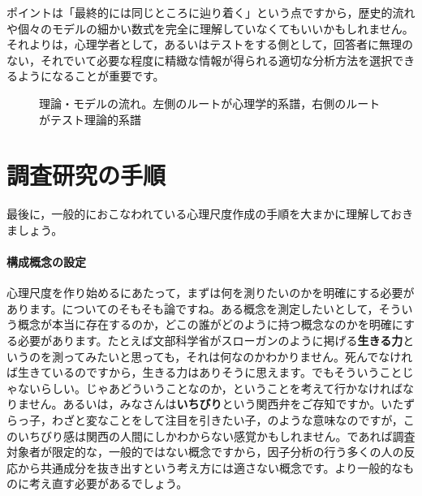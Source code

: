 \documentclass{ltjsbook}
\begin{document}
ポイントは「最終的には同じところに辿り着く」という点ですから，歴史的流れや個々のモデルの細かい数式を完全に理解していなくてもいいかもしれません。それよりは，心理学者として，あるいはテストをする側として，回答者に無理のない，それでいて必要な程度に精緻な情報が得られる適切な分析方法を選択できるようになることが重要です。
\begin{figure}[ht]
	\caption{理論・モデルの流れ。左側のルートが心理学的系譜，右側のルートがテスト理論的系譜}
	\label{fig:05_06}
\end{figure}

\section{調査研究の手順}
最後に，一般的におこなわれている心理尺度作成の手順を大まかに理解しておきましょう。

\paragraph{構成概念の設定}心理尺度を作り始めるにあたって，まずは何を測りたいのかを明確にする必要があります。についてのそもそも論ですね。ある概念を測定したいとして，そういう概念が本当に存在するのか，どこの誰がどのように持つ概念なのかを明確にする必要があります。たとえば文部科学省がスローガンのように掲げる\textbf{生きる力}というのを測ってみたいと思っても，それは何なのかわかりません。死んでなければ生きているのですから，生きる力はありそうに思えます。でもそういうことじゃないらしい。じゃあどういうことなのか，ということを考えて行かなければなりません。あるいは，みなさんは\textbf{いちびり}という関西弁をご存知ですか。いたずらっ子，わざと変なことをして注目を引きたい子，のような意味なのですが，このいちびり感は関西の人間にしかわからない感覚かもしれません。であれば調査対象者が限定的な，一般的ではない概念ですから，因子分析の行う多くの人の反応から共通成分を抜き出すという考え方には適さない概念です。より一般的なものに考え直す必要があるでしょう。
\end{document}
